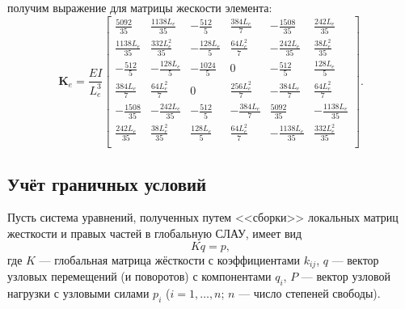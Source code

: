 \documentclass[12pt,a4paper]{article}
\begin{document}
получим выражение для матрицы жескости элемента:
%
%		
%
%
$$\textbf{K}_e=\frac{EI}{L_e^{3}}
\left[
  \begin{array}{cccccc}
    \frac{5092}{35} & \frac{1138 L_e}{35} & -\frac{512}{5} & \frac{384 L_e}{7} & -\frac{1508}{35}& \frac{242 L_{e}}{35}\\
        \frac{1138 L_{e}}{35} & \frac{332 L_e^{2}}{35} & -\frac{128 L_e}{5} & \frac{64 L_e^{2}}{7} & -\frac{242 L_{e}}{35}& \frac{38 L_{e}^{2}}{35}\\
    -\frac{512}{5} & -\frac{128 L_e}{5} & -\frac{1024}{5} & 0 & -\frac{512}{5}& \frac{128  L_{e}}{5}\\
        \frac{384 L_{e}}{7} & \frac{64 L_e^{2}}{7} & 0 & \frac{256 L_e^{2}}{7} & -\frac{384 L_{e}}{7}& \frac{64 L_{e}^{2}}{7}\\
    -\frac{1508}{35} & -\frac{242 L_e}{35} & -\frac{512}{5} & -\frac{384 L_{e}}{7} & \frac{5092}{35} &  -\frac{1138  L_{e}}{35}\\
        \frac{242 L_{e}}{35} & \frac{38 L_e^{2}}{35} &  \frac{128 L_e}{5} & \frac{64 L_e^{2}}{7} & -\frac{1138 L_{e}}{35}& \frac{332 L_{e}^{2}}{35}\\
  \end{array}
\right].
$$
%
%

\subsection{Учёт граничных условий}
Пусть система уравнений, полученных путем <<сборки>> локальных матриц жесткости и правых частей в глобальную СЛАУ, имеет вид
\begin{equation}
Kq=p,
	\label{gran_usl}
	\end{equation}
где $K$ --- глобальная матрица жёсткости с коэффициентами $k_{ij}$, $q$ --- вектор узловых перемещений (и поворотов) с компонентами  $q_{i}$, $P$ --- вектор узловой нагрузки с узловыми силами $p_{i}$ ($i=1,\ldots,n$;  $n$ --- число степеней свободы).
\end{document}
